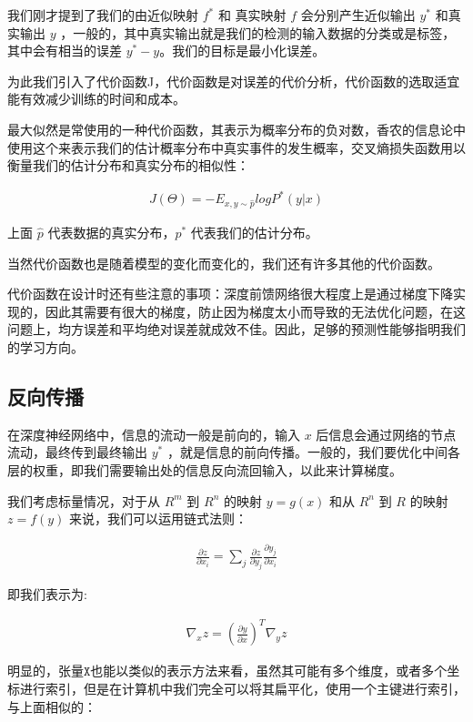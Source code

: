 我们刚才提到了我们的由近似映射 $ f^{\ast} $ 和 真实映射 $ f $ 会分别产生近似输出 $ y^{\ast} $ 和真实输出 $ y $ ，一般的，其中真实输出就是我们的检测的输入数据的分类或是标签，其中会有相当的误差 $ y^{\ast} - y $。我们的目标是最小化误差。

为此我们引入了代价函数J，代价函数是对误差的代价分析，代价函数的选取适宜能有效减少训练的时间和成本。

最大似然是常使用的一种代价函数，其表示为概率分布的负对数，香农的信息论中使用这个来表示我们的估计概率分布中真实事件的发生概率，交叉熵损失函数用以衡量我们的估计分布和真实分布的相似性：

\begin{eqnarray}
    J(\Theta) = - E_{x,y \sim \hat{p}}logP^{\ast}(y|x)
\end{eqnarray}

上面 $ \hat{p} $ 代表数据的真实分布，$ p^{\ast} $ 代表我们的估计分布。

当然代价函数也是随着模型的变化而变化的，我们还有许多其他的代价函数。

代价函数在设计时还有些注意的事项：深度前馈网络很大程度上是通过梯度下降实现的，因此其需要有很大的梯度，防止因为梯度太小而导致的无法优化问题，在这问题上，均方误差和平均绝对误差就成效不佳。因此，足够的预测性能够指明我们的学习方向。


\subsection{反向传播}

在深度神经网络中，信息的流动一般是前向的，输入 $ x $ 后信息会通过网络的节点流动，最终传到最终输出 $ y^{\ast} $ ，就是信息的前向传播。一般的，我们要优化中间各层的权重，即我们需要输出处的信息反向流回输入，以此来计算梯度。

我们考虑标量情况，对于从 $ R^{m} $ 到 $ R^{n} $ 的映射 $ y=g(x) $ 和从 $ R^{n} $ 到 $ R $ 的映射 $ z=f(y) $ 来说，我们可以运用链式法则：

\begin{eqnarray}
    \frac{\partial z}{\partial x_i} = \sum_{j} \frac{\partial z}{\partial y_j} \frac{\partial y_j}{\partial x_i}
\end{eqnarray}

即我们表示为:

\begin{eqnarray}
    \nabla_x z = (\frac{\partial y}{\partial x})^T \nabla_y z
\end{eqnarray} 

明显的，张量$ \mathtt{X} $也能以类似的表示方法来看，虽然其可能有多个维度，或者多个坐标进行索引，但是在计算机中我们完全可以将其扁平化，使用一个主键进行索引，与上面相似的：

